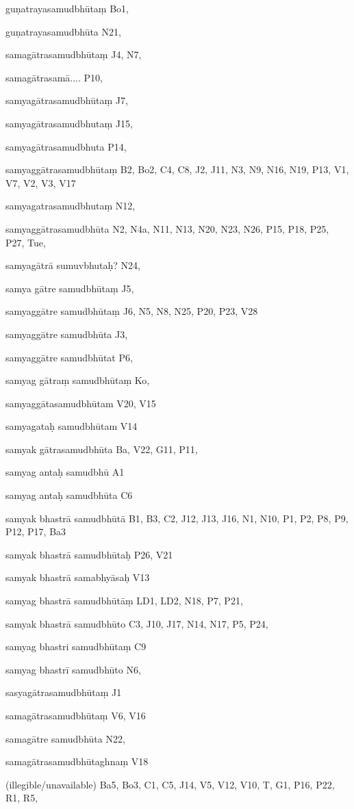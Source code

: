 \begin{ekdosis}
\begin{marma}[hp01_055]
\begin{marma}[hp02_009]
\begin{marma}[hp02_011]
\begin{marma}[hp02_67ab]
\begin{description}
    \end{description}
 \end{marma}

\begin{marma}[hp02_68a]
\item[guṇatrayasamudbhūtaṃ] Bo1,
\item[guṇatrayasamudbhūta] N21,
\item[samagātrasamudbhūtaṃ] J4, N7, 
\item[samagātrasamā....] P10, 
\item[samyagātrasamudbhūtaṃ] J7,
\item[samyagātrasamudbhutaṃ] J15,
\item[samyagātrasamudbhuta] P14,
\item[samyaggātrasamudbhūtaṃ] B2, Bo2, C4, C8, J2, J11, N3, N9, N16, N19, P13, V1, V7, V2, V3, V17
\item[samyagatrasamudbhutaṃ] N12,
\item[samyaggātrasamudbhūta] N2, N4a, N11, N13, N20, N23, N26, P15, P18, P25, P27, Tue, 
\item[samyagātrā sumuvbhutaḥ?] N24,
\item[samya gātre samudbhūtaṃ] J5,
\item[samyaggātre samudbhūtaṃ] J6, N5, N8, N25, P20, P23, V28
\item[samyaggātre samudbhūta] J3,
\item[samyaggātre samudbhūtat] P6, 
\item[samyag gātraṃ samudbhūtaṃ] Ko,
\item[samyaggātasamudbhūtam] V20, V15
\item[samyagataḥ samudbhūtam] V14
\item[samyak gātrasamudbhūta] Ba, V22, G11, P11, 
\item[samyag antaḥ samudbhū] A1
\item[samyag antaḥ samudbhūta] C6
\item[samyak bhastrā samudbhūtā] B1, B3, C2, J12, J13, J16, N1, N10, P1, P2, P8, P9, P12, P17, Ba3
\item[samyak bhastrā samudbhūtaḥ] P26, V21  
\item[samyak bhastrā samabhyāsaḥ] V13
\item[samyag bhastrā samudbhūtāṃ] LD1, LD2, N18, P7, P21, 
\item[samyak bhastrā samudbhūto] C3, J10, J17, N14, N17, P5, P24, 
\item[samyag bhastri samudbhūtaṃ] C9
\item[samyag bhastrī samudbhūto] N6, 
\item[sasyagātrasamudbhūtaṃ] J1
\item[samagātrasamudbhūtaṃ] V6, V16
\item[samagātre samudbhūta] N22,
\item[samagātrasamudbhūtaghnaṃ] V18
\item[(illegible/unavailable)] Ba5, Bo3, C1, C5, J14, V5, V12, V10, T, G1, P16, P22, R1, R5,
  \begin{description}


\end{description}
\end{marma}
\end{marma}
\end{marma}
\end{marma}
\end{ekdosis}
